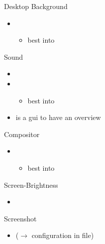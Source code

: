 \begin{frame}[fragile]{Desktop Background}
  \begin{itemize}
    \item {\tiny {}}
    \begin{itemize}
      \item best into 
    \end{itemize}
  \end{itemize}
\end{frame}

\begin{frame}[fragile]{Sound}
  \begin{itemize}
    \item {}
    \item {}
    \begin{itemize}
      \item best into 
    \end{itemize}
    \item {} is a gui to have an overview
  \end{itemize}
\end{frame}

\begin{frame}[fragile]{Compositor}
  \begin{itemize}
    \item {}
      \begin{itemize}
        \item best into 
      \end{itemize}
  \end{itemize}
\end{frame}

\begin{frame}[fragile]{Screen-Brightness}
  \begin{itemize}
    \item {}
  \end{itemize}
\end{frame}

\begin{frame}[fragile]{Screenshot}
  \begin{itemize}
    \item {} ($\rightarrow$ configuration in  file)
  \end{itemize}
\end{frame}


